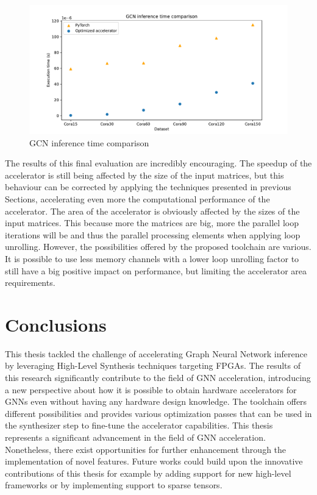 \documentclass[11pt,a4paper,twocolumn]{article}
\begin{document}
\begin{figure}[t]
    \centering
    \includegraphics[height=0.24\textwidth]{Images/gcn_forward_comparison}
    \caption{GCN inference time comparison}
    \label{fig:gcn-inference-comparison}
\end{figure}

The results of this final evaluation are incredibly encouraging.
The speedup of the accelerator is still being affected by the size of the input matrices, but this behaviour can be corrected by applying the techniques presented in previous Sections, accelerating even more the computational performance of the accelerator.
The area of the accelerator is obviously affected by the sizes of the input matrices.
This because more the matrices are big, more the parallel loop iterations will be and thus the parallel processing elements when applying loop unrolling.
However, the possibilities offered by the proposed toolchain are various.
It is possible to use less memory channels with a lower loop unrolling factor to still have a big positive impact on performance, but limiting the accelerator area requirements.

\section{Conclusions}
This thesis tackled the challenge of accelerating Graph Neural Network inference by leveraging High-Level Synthesis techniques targeting FPGAs.
The results of this research significantly contribute to the field of GNN acceleration, introducing a new perspective about how it is possible to obtain hardware accelerators for GNNs even without having any hardware design knowledge.
The toolchain offers different possibilities and provides various optimization passes that can be used in the synthesizer step to fine-tune the accelerator capabilities.
This thesis represents a significant advancement in the field of GNN acceleration.
Nonetheless, there exist opportunities for further enhancement through the implementation of novel features.
Future works could build upon the innovative contributions of this thesis for example by adding support for new high-level frameworks or by implementing support to sparse tensors.


\end{document}
